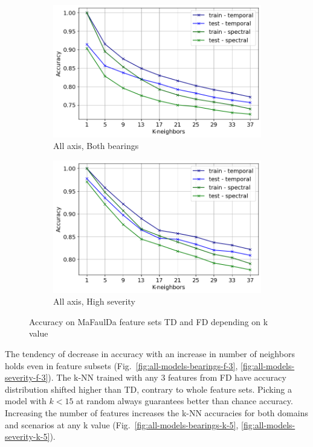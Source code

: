 \documentclass{llncs}
\begin{document}
\begin{figure}
\begin{subfigure}[b]{0.32\textwidth}
         \includegraphics[width=\textwidth]{fig/all-features-mafaulda/all-axis-all-bearings.png}
         \caption{All axis, Both bearings}
     \end{subfigure}
     \hfill
     \begin{subfigure}[b]{0.32\textwidth}
         \centering
         \includegraphics[width=\textwidth]{fig/all-features-mafaulda/all-axis-severity.png}
         \caption{All axis, High severity}
     \end{subfigure}
     \caption{Accuracy on MaFaulDa feature sets TD and FD depending on k value}
     \label{fig:accuracy-all-features}
\end{figure}

The tendency of decrease in accuracy with an increase in number of neighbors holds even in feature subsets (Fig.~\ref{fig:all-models-bearings-f-3}, \ref{fig:all-models-severity-f-3}). The k-NN trained with any 3 features from FD have accuracy distribution shifted higher than TD, contrary to whole feature sets. Picking a model with $k < 15$ at random always guarantees better than chance accuracy. Increasing the number of features increases the k-NN accuracies for both domains and scenarios at any k value (Fig.~\ref{fig:all-models-bearings-k-5}, \ref{fig:all-models-severity-k-5}).
\end{document}
